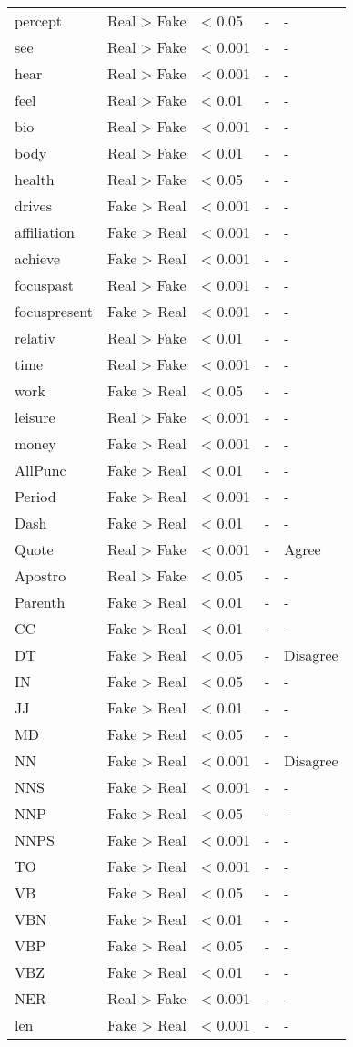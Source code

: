 \documentclass[../thesis.tex]{subfiles}
\begin{document}
\begin{longtable}[t]{lllll}
percept & Real > Fake & < 0.05 & - & -\\
see & Real > Fake & < 0.001 & - & -\\
\addlinespace
hear & Real > Fake & < 0.001 & - & -\\
feel & Real > Fake & < 0.01 & - & -\\
bio & Real > Fake & < 0.001 & - & -\\
body & Real > Fake & < 0.01 & - & -\\
health & Real > Fake & < 0.05 & - & -\\
\addlinespace
drives & Fake > Real & < 0.001 & - & -\\
affiliation & Fake > Real & < 0.001 & - & -\\
achieve & Fake > Real & < 0.001 & - & -\\
focuspast & Real > Fake & < 0.001 & - & -\\
focuspresent & Fake > Real & < 0.001 & - & -\\
\addlinespace
relativ & Real > Fake & < 0.01 & - & -\\
time & Real > Fake & < 0.001 & - & -\\
work & Fake > Real & < 0.05 & - & -\\
leisure & Real > Fake & < 0.001 & - & -\\
money & Fake > Real & < 0.001 & - & -\\
\addlinespace
AllPunc & Fake > Real & < 0.01 & - & -\\
Period & Fake > Real & < 0.001 & - & -\\
Dash & Fake > Real & < 0.01 & - & -\\
Quote & Real > Fake & < 0.001 & - & Agree\\
Apostro & Real > Fake & < 0.05 & - & -\\
\addlinespace
Parenth & Fake > Real & < 0.01 & - & -\\
CC & Fake > Real & < 0.01 & - & -\\
DT & Fake > Real & < 0.05 & - & Disagree\\
IN & Fake > Real & < 0.05 & - & -\\
JJ & Fake > Real & < 0.01 & - & -\\
\addlinespace
MD & Fake > Real & < 0.05 & - & -\\
NN & Fake > Real & < 0.001 & - & Disagree\\
NNS & Fake > Real & < 0.001 & - & -\\
NNP & Fake > Real & < 0.05 & - & -\\
NNPS & Fake > Real & < 0.001 & - & -\\
\addlinespace
TO & Fake > Real & < 0.001 & - & -\\
VB & Fake > Real & < 0.05 & - & -\\
VBN & Fake > Real & < 0.01 & - & -\\
VBP & Fake > Real & < 0.05 & - & -\\
VBZ & Fake > Real & < 0.01 & - & -\\
\addlinespace
NER & Real > Fake & < 0.001 & - & -\\
len & Fake > Real & < 0.001 & - & -\\
\bottomrule
\end{longtable}
\end{document}

